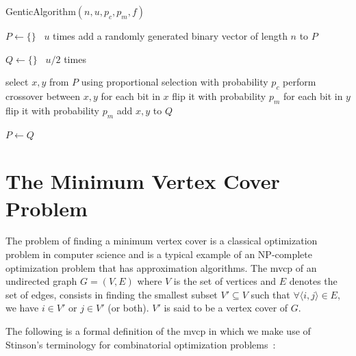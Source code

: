\documentclass[12pt]{article}
\begin{document}
\begin{algorithm}[!htbp]
\caption{GenticAlgorithm$\left( n, u, p_c, p_m, f \right)$}
\label{alg:ga}

\begin{algorithmic}[1]


\State $ P \gets \{ \} $
\Loop \ $u$ times
\State add a randomly generated binary vector of length $n$ to $P$
\EndLoop

\State $Q \gets \{ \}$
\Loop \ $u/2$ times

\State select $x, y$ from $P$ using proportional selection
\State with probability $p_c$ perform crossover between $x, y$
\label{alg:crossover}
\State for each bit in $x$ flip it with probability $p_m$
\label{alg:m1}
\State for each bit in $y$ flip it with probability $p_m$
\label{alg:m2}
\State add $x, y$ to $Q$

\EndLoop

\State $P \gets Q$
\EndWhile


\end{algorithmic}

\end{algorithm}



\section{The Minimum Vertex Cover Problem}
\label{sec:mvcp}
The problem of finding a minimum vertex cover is a classical
optimization problem in computer science and is a typical
example of an NP-complete optimization problem \cite{wolfram:mvc}
that has approximation algorithms.
The mvcp of an undirected graph $G = (V, E)$ where $V$ is
the set of vertices and $E$ denotes the set of edges,
consists in finding the smallest subset $V' \subseteq V$ such that
$\forall \langle i, j \rangle \in E$, we have $i \in V'$ or $j \in V'$ (or both).
$V'$ is said to be a vertex cover of $G$.

The following is a formal definition of
the mvcp in which we make use of Stinson's terminology
for combinatorial optimization problems~\cite{14:mvcp}:
\end{document}
